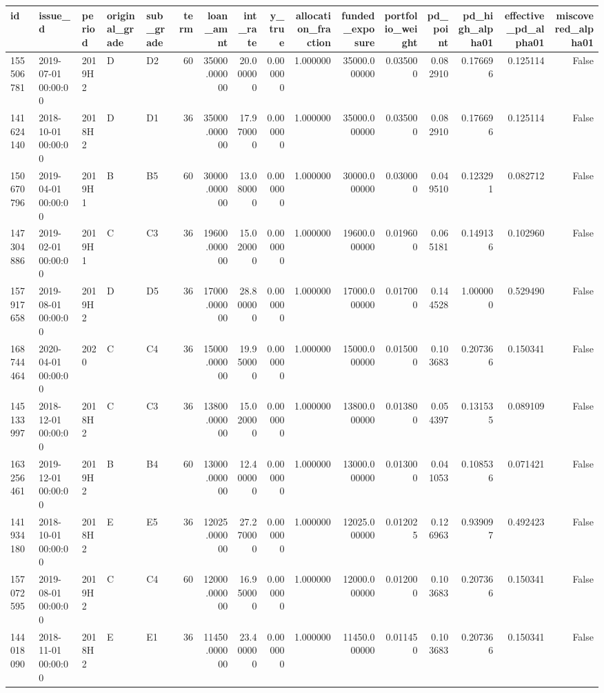 \begin{tabular}{lllllrrrrrrrrrrr}
\toprule
id & issue\_d & period & original\_grade & sub\_grade & term & loan\_amnt & int\_rate & y\_true & allocation\_fraction & funded\_exposure & portfolio\_weight & pd\_point & pd\_high\_alpha01 & effective\_pd\_alpha01 & miscovered\_alpha01 \\
\midrule
155506781 & 2019-07-01 00:00:00 & 2019H2 & D & D2 & 60 & 35000.000000 & 20.000000 & 0.000000 & 1.000000 & 35000.000000 & 0.035000 & 0.082910 & 0.176696 & 0.125114 & False \\
141624140 & 2018-10-01 00:00:00 & 2018H2 & D & D1 & 36 & 35000.000000 & 17.970000 & 0.000000 & 1.000000 & 35000.000000 & 0.035000 & 0.082910 & 0.176696 & 0.125114 & False \\
150670796 & 2019-04-01 00:00:00 & 2019H1 & B & B5 & 60 & 30000.000000 & 13.080000 & 0.000000 & 1.000000 & 30000.000000 & 0.030000 & 0.049510 & 0.123291 & 0.082712 & False \\
147304886 & 2019-02-01 00:00:00 & 2019H1 & C & C3 & 36 & 19600.000000 & 15.020000 & 0.000000 & 1.000000 & 19600.000000 & 0.019600 & 0.065181 & 0.149136 & 0.102960 & False \\
157917658 & 2019-08-01 00:00:00 & 2019H2 & D & D5 & 36 & 17000.000000 & 28.800000 & 0.000000 & 1.000000 & 17000.000000 & 0.017000 & 0.144528 & 1.000000 & 0.529490 & False \\
168744464 & 2020-04-01 00:00:00 & 2020 & C & C4 & 36 & 15000.000000 & 19.950000 & 0.000000 & 1.000000 & 15000.000000 & 0.015000 & 0.103683 & 0.207366 & 0.150341 & False \\
145133997 & 2018-12-01 00:00:00 & 2018H2 & C & C3 & 36 & 13800.000000 & 15.020000 & 0.000000 & 1.000000 & 13800.000000 & 0.013800 & 0.054397 & 0.131535 & 0.089109 & False \\
163256461 & 2019-12-01 00:00:00 & 2019H2 & B & B4 & 60 & 13000.000000 & 12.400000 & 0.000000 & 1.000000 & 13000.000000 & 0.013000 & 0.041053 & 0.108536 & 0.071421 & False \\
141934180 & 2018-10-01 00:00:00 & 2018H2 & E & E5 & 36 & 12025.000000 & 27.270000 & 0.000000 & 1.000000 & 12025.000000 & 0.012025 & 0.126963 & 0.939097 & 0.492423 & False \\
157072595 & 2019-08-01 00:00:00 & 2019H2 & C & C4 & 60 & 12000.000000 & 16.950000 & 0.000000 & 1.000000 & 12000.000000 & 0.012000 & 0.103683 & 0.207366 & 0.150341 & False \\
144018090 & 2018-11-01 00:00:00 & 2018H2 & E & E1 & 36 & 11450.000000 & 23.400000 & 0.000000 & 1.000000 & 11450.000000 & 0.011450 & 0.103683 & 0.207366 & 0.150341 & False \\

\end{tabular}
